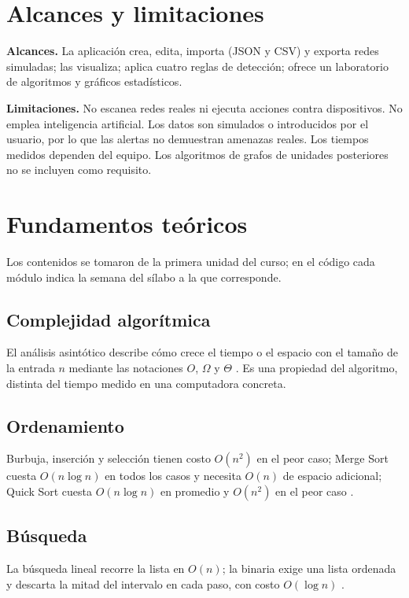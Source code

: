\documentclass[12pt,a4paper]{article}
\begin{document}
\section{Alcances y limitaciones}
\textbf{Alcances.} La aplicación crea, edita, importa (JSON y CSV) y exporta redes simuladas; las visualiza; aplica cuatro reglas de detección; ofrece un laboratorio de algoritmos y gráficos estadísticos.

\noindent\textbf{Limitaciones.} No escanea redes reales ni ejecuta acciones contra dispositivos. No emplea inteligencia artificial. Los datos son simulados o introducidos por el usuario, por lo que las alertas no demuestran amenazas reales. Los tiempos medidos dependen del equipo. Los algoritmos de grafos de unidades posteriores no se incluyen como requisito.

\section{Fundamentos teóricos}
Los contenidos se tomaron de la primera unidad del curso; en el código cada módulo indica la semana del sílabo a la que corresponde.

\subsection{Complejidad algorítmica}
El análisis asintótico describe cómo crece el tiempo o el espacio con el tamaño de la entrada $n$ mediante las notaciones $O$, $\Omega$ y $\Theta$ \cite{cormen2022,levitin2012}. Es una propiedad del algoritmo, distinta del tiempo medido en una computadora concreta.

\subsection{Ordenamiento}
Burbuja, inserción y selección tienen costo $O(n^2)$ en el peor caso; Merge Sort cuesta $O(n\log n)$ en todos los casos y necesita $O(n)$ de espacio adicional; Quick Sort cuesta $O(n\log n)$ en promedio y $O(n^2)$ en el peor caso \cite{cormen2022,sedgewick2011,knuth1998}.

\subsection{Búsqueda}
La búsqueda lineal recorre la lista en $O(n)$; la binaria exige una lista ordenada y descarta la mitad del intervalo en cada paso, con costo $O(\log n)$ \cite{sedgewick2011}.
\end{document}
